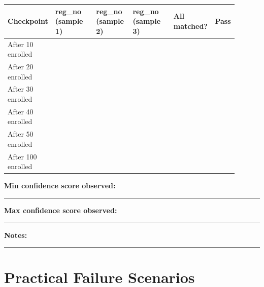 \documentclass[11pt,a4paper,oneside]{article}
\newcommand{\chk}{\fbox{\rule{0pt}{0.95ex}\rule{0.95ex}{0pt}}}
\newcommand{\fillin}[1][3cm]{\rule{#1}{0.4pt}}
\newcommand{\fillinlong}{\rule{0.72\textwidth}{0.4pt}}
\newcommand{\notesblock}{\par\smallskip\noindent\textbf{Notes:}\ \fillinlong\par\smallskip}
\newcommand{\fieldline}[1]{\par\smallskip\noindent\textbf{#1}\ \fillin\par}
\begin{document}
\smallskip
\small
\begin{tabular}{@{}>{\raggedright\arraybackslash}p{0.14\linewidth} >{\raggedright\arraybackslash}p{0.18\linewidth} >{\raggedright\arraybackslash}p{0.16\linewidth} >{\raggedright\arraybackslash}p{0.18\linewidth} >{\raggedright\arraybackslash}p{0.18\linewidth} >{\centering\arraybackslash}p{0.06\linewidth}@{}}
  \toprule
  \textbf{Checkpoint} & \textbf{reg\_no (sample 1)} & \textbf{reg\_no (sample 2)} & \textbf{reg\_no (sample 3)} & \textbf{All matched?} & \textbf{Pass} \\
  \midrule
  After 10 enrolled  & & & & & \chk \\
  After 20 enrolled  & & & & & \chk \\
  After 30 enrolled  & & & & & \chk \\
  After 40 enrolled  & & & & & \chk \\
  After 50 enrolled  & & & & & \chk \\
  After 100 enrolled & & & & & \chk \\
  \bottomrule
\end{tabular}
\normalsize

\fieldline{Min confidence score observed:}
\fieldline{Max confidence score observed:}
\notesblock

\section{Practical Failure Scenarios}
\end{document}
